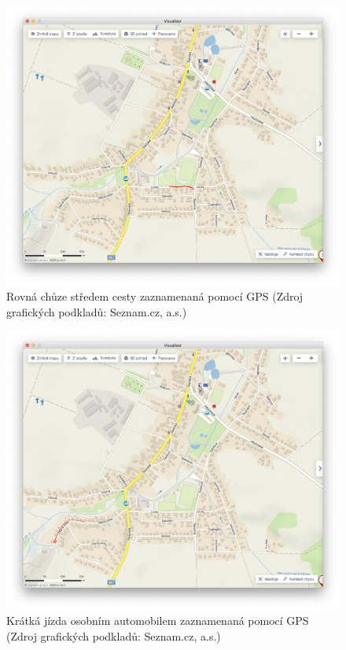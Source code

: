 \documentclass[czech, bachelor]{diploma}
\begin{document}
\begin{figure}
    \centering
    \includegraphics[width=1\textwidth]{Figures/louky.png}
    \caption{Rovná chůze středem cesty zaznamenaná pomocí GPS (Zdroj grafických podkladů: Seznam.cz, a.s.)}
    \label{fig:louky-fullsize}
\end{figure}

\begin{figure}
    \centering
    \includegraphics[width=1\textwidth]{Figures/olsinaautem.png}
    \caption{Krátká jízda osobním automobilem zaznamenaná pomocí GPS (Zdroj grafických podkladů: Seznam.cz, a.s.)}
    \label{fig:olsinaautem-fullsize}
\end{figure}
\end{document}
